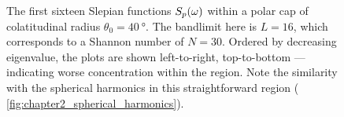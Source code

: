 \begin{figure}[htpb]
\newline
{} %
\hfill
{} %
\hfill
{} %
\hfill
{} %
\caption[
The Slepian functions within a \(\SI{40}{\degree}\) polar cap
]{
The first sixteen Slepian functions \({S}_{p}(\omega)\) within a polar cap of colatitudinal radius \(\theta_{0}=\SI{40}{\degree}\).
The bandlimit here is  \(L=16\), which corresponds to a Shannon number of \(N=30\).
Ordered by decreasing eigenvalue, the plots are shown left-to-right, top-to-bottom --- indicating worse concentration within the region.
Note the similarity with the spherical harmonics in this straightforward region (\cf{} \cref{fig:chapter2_spherical_harmonics}).
}\label{fig:chapter2_slepian_polar_cap}
\end{figure}
